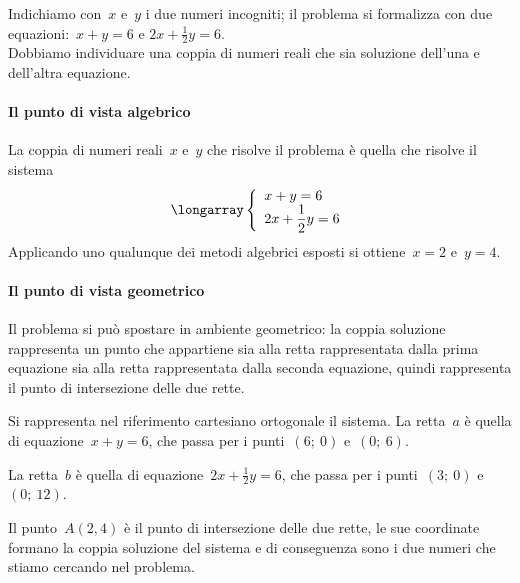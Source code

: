 \begin{soluzione}
Indichiamo con~\(x\) e~\(y\) i due numeri incogniti; il problema si formalizza
con due equazioni:~\(x+y=6\) \quad e \quad \(2x+\frac{1}{2}y=6\).\\
Dobbiamo individuare una coppia di numeri reali che sia soluzione
dell'una e dell'altra equazione.

\paragraph{Il punto di vista algebrico}
La coppia di numeri reali~\(x\) e~\(y\) che risolve il problema è quella che
risolve il sistema
\[\longarray\left\{\begin{array}{l}x+y=6\\2x+\dfrac{1}{2}y=6 
\end{array}\right.\]
Applicando uno qualunque dei metodi algebrici esposti si ottiene~\(x=2\) e~\(y=4\).

\paragraph{Il punto di vista geometrico}

Il problema si può spostare in ambiente geometrico: la coppia
soluzione rappresenta un punto che appartiene sia alla retta
rappresentata dalla prima equazione sia alla retta rappresentata dalla
seconda equazione, quindi rappresenta il punto di intersezione delle due rette.

Si rappresenta nel riferimento cartesiano ortogonale il sistema.
La retta~\(a\) è quella di equazione~\(x+y=6\), che passa per i
punti~\((6;~0)\) e~\((0;~6)\).

La retta~\(b\) è quella di equazione~\(2x+\frac{1}{2}y=6\), che
passa per i punti~\((3;~0)\) e~\((0;~12)\).

Il punto~\(A(2,4)\) è il punto di intersezione delle due rette, le sue
coordinate formano la coppia soluzione del sistema e di conseguenza
sono i due numeri che stiamo cercando nel problema.

\begin{center}
\begin{inaccessibleblock}
 
\end{inaccessibleblock}
\end{center}
 \end{soluzione}

